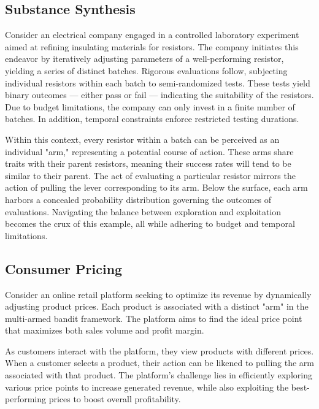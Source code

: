 \subsection{Substance Synthesis}
\label{ex:substance-synthesis}

Consider an electrical company engaged in a controlled laboratory experiment aimed at refining insulating materials for resistors. The company initiates this endeavor by iteratively adjusting parameters of a well-performing resistor, yielding a series of distinct batches. Rigorous evaluations follow, subjecting individual resistors within each batch to semi-randomized tests. These tests yield binary outcomes — either pass or fail — indicating the suitability of the resistors. Due to budget limitations, the company can only invest in a finite number of batches. In addition, temporal constraints enforce restricted testing durations.

Within this context, every resistor within a batch can be perceived as an individual "arm," representing a potential course of action. These arms share traits with their parent resistors, meaning their success rates will tend to be similar to their parent. The act of evaluating a particular resistor mirrors the action of pulling the lever corresponding to its arm. Below the surface, each arm harbors a concealed probability distribution governing the outcomes of evaluations. Navigating the balance between exploration and exploitation becomes the crux of this example, all while adhering to budget and temporal limitations.


\subsection{Consumer Pricing}
\label{ex:dynamic-pricing}

Consider an online retail platform seeking to optimize its revenue by dynamically adjusting product prices. Each product is associated with a distinct "arm" in the multi-armed bandit framework. The platform aims to find the ideal price point that maximizes both sales volume and profit margin.

As customers interact with the platform, they view products with different prices. When a customer selects a product, their action can be likened to pulling the arm associated with that product. The platform's challenge lies in efficiently exploring various price points to increase generated revenue, while also exploiting the best-performing prices to boost overall profitability.

